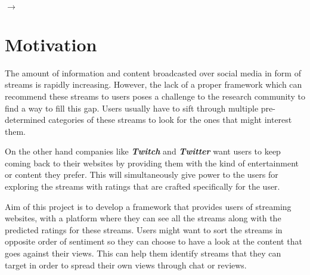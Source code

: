 \documentclass[11pt]{article}
\begin{document}
 \hspace{3.75cm} \\
 \hspace{1cm} $ \rightarrow $ \hspace{1cm} 

\section{Motivation}
\par
The amount of information and content broadcasted over social media in form of streams is rapidly increasing. However, the lack of a proper framework which can recommend these streams to users poses a challenge to the research community to find a way to fill this gap. Users usually have to sift through multiple pre-determined categories of these streams to look for the ones that might interest them.
\par
On the other hand companies like \textbf{\textit{Twitch}} and \textbf{\textit{Twitter}} want users to keep coming back to their websites by providing them with the kind of entertainment or content they prefer. This will simultaneously give power to the users for exploring the streams with ratings that are crafted specifically for the user.
\par
Aim of this project is to develop a framework that provides users of streaming websites, with a platform where they can see all the streams along with the predicted ratings for these streams. Users might want to sort the streams in opposite order of sentiment so they can choose to have a look at the content that goes against their views. This can help them identify streams that they can target in order to spread their own views through chat or reviews.
\end{document}
